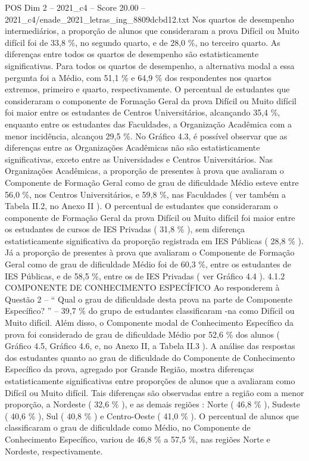 \begin{textsample}{POS Dim 2 – 2021\_c4 – Score 20.00 – 2021\_c4/enade\_2021\_letras\_ing\_8809dcbd12.txt}
Nos quartos de desempenho intermediários, a proporção de alunos que consideraram a prova Difícil ou Muito difícil foi de 33,8 \%, no segundo quarto, e de 28,0 \%, no terceiro quarto.
As diferenças entre todos os quartos de desempenho são estatisticamente significativas.
Para todos os quartos de desempenho, a alternativa modal a essa pergunta foi a Médio, com 51,1 \% e 64,9 \% dos respondentes nos quartos extremos, primeiro e quarto, respectivamente.
O percentual de estudantes que consideraram o componente de Formação Geral da prova Difícil ou Muito difícil foi maior entre os estudantes de Centros Universitários, alcançando 35,4 \%, enquanto entre os estudantes das Faculdades, a Organização Acadêmica com a menor incidência, alcançou 29,5 \%.
No Gráfico 4.3, é possível observar que as diferenças entre as Organizações Acadêmicas não são estatisticamente significativas, exceto entre as Universidades e Centros Universitários.
Nas Organizações Acadêmicas, a proporção de presentes à prova que avaliaram o Componente de Formação Geral como de grau de dificuldade Médio esteve entre 56,0 \%, nos Centros Universitários, e 59,8 \%, nas Faculdades ( ver também a Tabela II.2, no Anexo II ).
O percentual de estudantes que consideraram o componente de Formação Geral da prova Difícil ou Muito difícil foi maior entre os estudantes de cursos de IES Privadas ( 31,8 \% ), sem diferença estatisticamente significativa da proporção registrada em IES Públicas ( 28,8 \% ).
Já a proporção de presentes à prova que avaliaram o Componente de Formação Geral como de grau de dificuldade Médio foi de 60,3 \%, entre os estudantes de IES Públicas, e de 58,5 \%, entre os de IES Privadas ( ver Gráfico 4.4 ). 4.1.2 COMPONENTE DE CONHECIMENTO ESPECÍFICO Ao responderem à Questão 2 – “ Qual o grau de dificuldade desta prova na parte de Componente Específico? ” – 39,7 \% do grupo de estudantes classificaram -na como Difícil ou Muito difícil.
Além disso, o Componente modal de Conhecimento Específico da prova foi considerado de grau de dificuldade Médio por 52,6 \% dos alunos ( Gráfico 4.5, Gráfico 4.6, e, no Anexo II, a Tabela II.3 ).
A análise das respostas dos estudantes quanto ao grau de dificuldade do Componente de Conhecimento Específico da prova, agregado por Grande Região, mostra diferenças estatisticamente significativas entre proporções de alunos que a avaliaram como Difícil ou Muito difícil.
Tais diferenças são observadas entre a região com a menor proporção, a Nordeste ( 32,6 \% ), e as demais regiões : Norte ( 46,8 \% ), Sudeste ( 40,6 \% ), Sul ( 40,8 \% ) e Centro-Oeste ( 41,0 \% ).
O percentual de alunos que classificaram o grau de dificuldade como Médio, no Componente de Conhecimento Específico, variou de 46,8 \% a 57,5 \%, nas regiões Norte e Nordeste, respectivamente.

\end{textsample}
